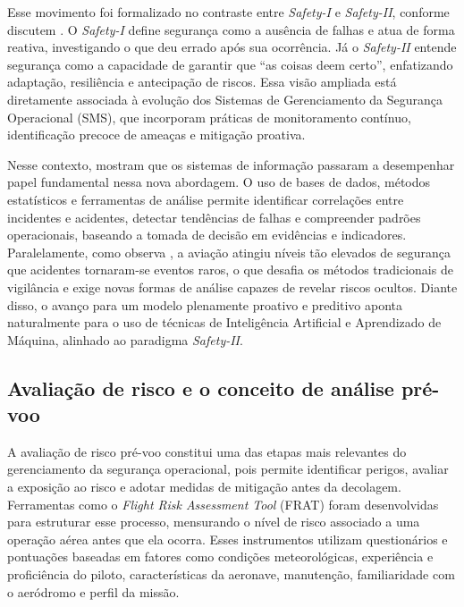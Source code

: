 \documentclass[english,brazilian]{UNISINOSartigo}
\begin{document}
Esse movimento foi formalizado no contraste entre \textit{Safety-I} e
\textit{Safety-II}, conforme discutem . O \textit{Safety-I}
define segurança como a ausência de falhas e atua de forma reativa, investigando o
que deu errado após sua ocorrência. Já o \textit{Safety-II} entende segurança como
a capacidade de garantir que ``as coisas deem certo'', enfatizando adaptação,
resiliência e antecipação de riscos. Essa visão ampliada está diretamente associada
à evolução dos Sistemas de Gerenciamento da Segurança Operacional (SMS), que
incorporam práticas de monitoramento contínuo, identificação precoce de ameaças e
mitigação proativa.

Nesse contexto,  mostram que os sistemas de informação
passaram a desempenhar papel fundamental nessa nova abordagem. O uso de bases
de dados, métodos estatísticos e ferramentas de análise permite identificar
correlações entre incidentes e acidentes, detectar tendências de falhas e
compreender padrões operacionais, baseando a tomada de decisão em evidências e
indicadores. Paralelamente, como observa , a aviação atingiu
níveis tão elevados de segurança que acidentes tornaram-se eventos raros, o que
desafia os métodos tradicionais de vigilância e exige novas formas de análise
capazes de revelar riscos ocultos. Diante disso, o avanço para um modelo
plenamente proativo e preditivo aponta naturalmente para o uso de técnicas de
Inteligência Artificial e Aprendizado de Máquina, alinhado ao paradigma
\textit{Safety-II}.



\subsection{Avaliação de risco e o conceito de análise pré-voo}

A avaliação de risco pré-voo constitui uma das etapas mais relevantes do
gerenciamento da segurança operacional, pois permite identificar perigos, avaliar a
exposição ao risco e adotar medidas de mitigação antes da decolagem. Ferramentas
como o \textit{Flight Risk Assessment Tool} (FRAT) foram desenvolvidas para
estruturar esse processo, mensurando o nível de risco associado a uma operação
aérea antes que ela ocorra. Esses instrumentos utilizam questionários e pontuações
baseadas em fatores como condições meteorológicas, experiência e proficiência do
piloto, características da aeronave, manutenção, familiaridade com o aeródromo e
perfil da missão.
\end{document}

